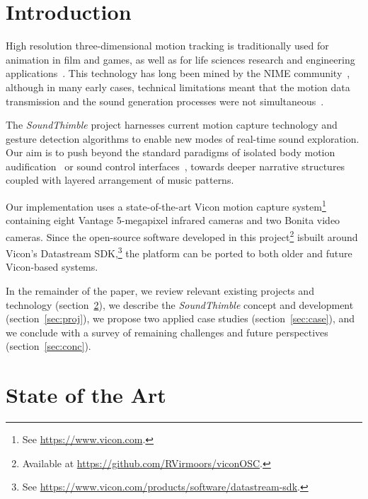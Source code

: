 \documentclass{nime-alternate}
\begin{document}
\section{Introduction}





High resolution three-dimensional motion tracking is traditionally used for animation in film and games, as well as for life sciences research and engineering applications~\cite{welch2002motion}. This technology has long been mined by the NIME community~\cite{dobrian2003gestural, nymoen2011soundsaber}, although in many early cases, technical limitations meant that the motion data transmission and the sound generation processes were not simultaneous~\cite{dobrian2003gestural, kapur2005framework}.


The \textit{SoundThimble} project harnesses current motion capture technology and gesture detection algorithms to enable new modes of real-time sound exploration. Our aim is to push beyond the standard paradigms of isolated body motion audification~\cite{dobrian2003gestural,kapur2005framework} or sound control interfaces~\cite{eckel2009motion,nymoen2011soundsaber}, towards deeper narrative structures coupled with layered arrangement of music patterns.


Our implementation uses a state-of-the-art Vicon motion capture system\footnote{See  \url{https://www.vicon.com}.} containing eight Vantage 5-megapixel infrared cameras and two Bonita video cameras. Since the open-source software developed in this project\footnote{Available at  \url{https://github.com/RVirmoors/viconOSC}.} is\linebreak built around Vicon's Datastream SDK,\footnote{See  \url{https://www.vicon.com/products/software/datastream-sdk}.} the platform can be ported to both older and future Vicon-based systems.

In the remainder of the paper, we review relevant existing projects and technology (section~\ref{sec:related}), we describe the \textit{SoundThimble} concept and development (section~\ref{sec:proj}), we propose two applied case studies (section~\ref{sec:case}), and we conclude with a survey of remaining challenges and future perspectives (section~\ref{sec:conc}).


\section{State of the Art}
\label{sec:related}
\end{document}
